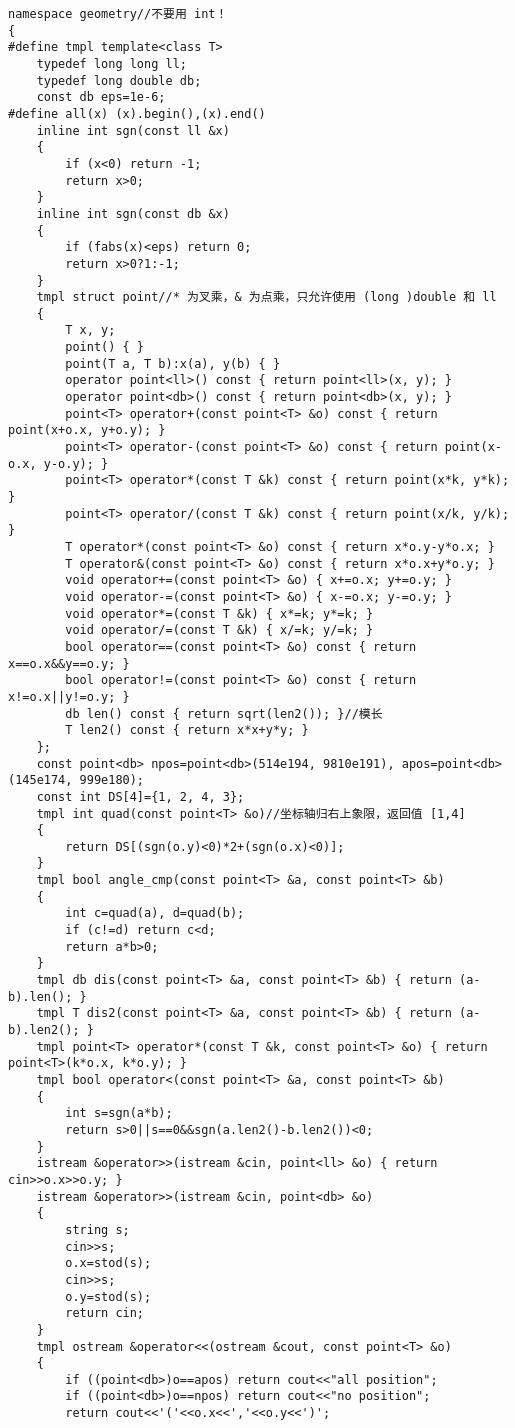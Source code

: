\documentclass[12pt]{ctexart}
\begin{document}
\begin{lstlisting}
namespace geometry//不要用 int！
{
#define tmpl template<class T>
	typedef long long ll;
	typedef long double db;
	const db eps=1e-6;
#define all(x) (x).begin(),(x).end()
	inline int sgn(const ll &x)
	{
		if (x<0) return -1;
		return x>0;
	}
	inline int sgn(const db &x)
	{
		if (fabs(x)<eps) return 0;
		return x>0?1:-1;
	}
	tmpl struct point//* 为叉乘，& 为点乘，只允许使用 (long )double 和 ll
	{
		T x, y;
		point() { }
		point(T a, T b):x(a), y(b) { }
		operator point<ll>() const { return point<ll>(x, y); }
		operator point<db>() const { return point<db>(x, y); }
		point<T> operator+(const point<T> &o) const { return point(x+o.x, y+o.y); }
		point<T> operator-(const point<T> &o) const { return point(x-o.x, y-o.y); }
		point<T> operator*(const T &k) const { return point(x*k, y*k); }
		point<T> operator/(const T &k) const { return point(x/k, y/k); }
		T operator*(const point<T> &o) const { return x*o.y-y*o.x; }
		T operator&(const point<T> &o) const { return x*o.x+y*o.y; }
		void operator+=(const point<T> &o) { x+=o.x; y+=o.y; }
		void operator-=(const point<T> &o) { x-=o.x; y-=o.y; }
		void operator*=(const T &k) { x*=k; y*=k; }
		void operator/=(const T &k) { x/=k; y/=k; }
		bool operator==(const point<T> &o) const { return x==o.x&&y==o.y; }
		bool operator!=(const point<T> &o) const { return x!=o.x||y!=o.y; }
		db len() const { return sqrt(len2()); }//模长
		T len2() const { return x*x+y*y; }
	};
	const point<db> npos=point<db>(514e194, 9810e191), apos=point<db>(145e174, 999e180);
	const int DS[4]={1, 2, 4, 3};
	tmpl int quad(const point<T> &o)//坐标轴归右上象限，返回值 [1,4]
	{
		return DS[(sgn(o.y)<0)*2+(sgn(o.x)<0)];
	}
	tmpl bool angle_cmp(const point<T> &a, const point<T> &b)
	{
		int c=quad(a), d=quad(b);
		if (c!=d) return c<d;
		return a*b>0;
	}
	tmpl db dis(const point<T> &a, const point<T> &b) { return (a-b).len(); }
	tmpl T dis2(const point<T> &a, const point<T> &b) { return (a-b).len2(); }
	tmpl point<T> operator*(const T &k, const point<T> &o) { return point<T>(k*o.x, k*o.y); }
	tmpl bool operator<(const point<T> &a, const point<T> &b)
	{
		int s=sgn(a*b);
		return s>0||s==0&&sgn(a.len2()-b.len2())<0;
	}
	istream &operator>>(istream &cin, point<ll> &o) { return cin>>o.x>>o.y; }
	istream &operator>>(istream &cin, point<db> &o)
	{
		string s;
		cin>>s;
		o.x=stod(s);
		cin>>s;
		o.y=stod(s);
		return cin;
	}
	tmpl ostream &operator<<(ostream &cout, const point<T> &o)
	{
		if ((point<db>)o==apos) return cout<<"all position";
		if ((point<db>)o==npos) return cout<<"no position";
		return cout<<'('<<o.x<<','<<o.y<<')';

\end{lstlisting}
\end{document}
